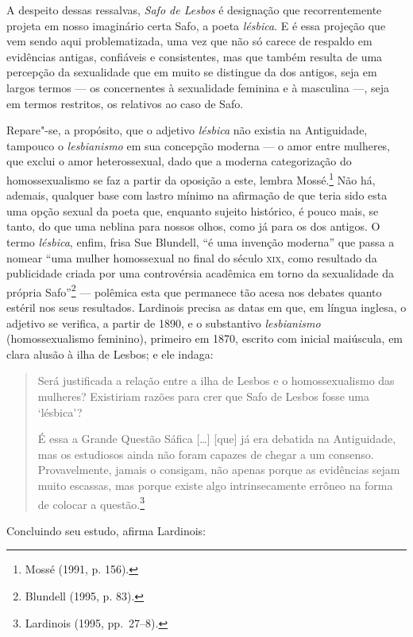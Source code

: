 A despeito dessas ressalvas, \textit{Safo de Lesbos} é designação que
recorrentemente projeta em nosso imaginário certa Safo, a poeta
\textit{lésbica}. E é essa projeção que vem sendo aqui
problematizada, uma vez que não só carece de respaldo em evidências antigas,
confiáveis e consistentes, mas que também resulta de uma percepção da
sexualidade que em muito se distingue da dos antigos, seja em largos termos ---
os concernentes à sexualidade feminina e à masculina ---, seja em termos
restritos, os relativos ao caso de Safo. 

Repare"-se, a propósito, que o adjetivo \textit{lésbica} não existia na
Antiguidade, tampouco o \textit{lesbianismo} em sua concepção moderna --- o amor
entre mulheres, que exclui o amor heterossexual, dado que a moderna
categorização do homossexualismo se faz a partir da oposição a este, lembra Mossé.\footnote{ Mossé (1991, p. 156).} Não há,
ademais, qualquer base com lastro mínimo na afirmação de que teria sido esta
uma opção sexual da poeta que, enquanto sujeito histórico, é pouco mais, se
tanto, do que uma neblina para nossos olhos, como já para os dos antigos. O
termo \textit{lésbica}, enfim, frisa Sue Blundell, “é uma
invenção moderna” que passa a nomear “uma mulher homossexual no final do século
\textsc{xix}, como resultado da publicidade criada por uma controvérsia acadêmica em
torno da sexualidade da própria Safo”\footnote{ Blundell (1995, p. 83).} --- polêmica esta que permanece tão acesa
nos debates quanto estéril nos seus resultados.
Lardinois precisa as datas em que, em
língua inglesa, o adjetivo se verifica, a partir de 1890, e o substantivo
\textit{lesbianismo} (homossexualismo feminino), primeiro em 1870, escrito com
inicial maiúscula, em clara alusão à ilha de Lesbos; e ele indaga:

\begin{quote}
Será justificada a relação entre a ilha de Lesbos e o homossexualismo das
mulheres? Existiriam razões para crer que Safo de Lesbos fosse uma ‘lésbica’?

É essa a Grande Questão Sáfica [\ldots{}] [que] já era debatida na Antiguidade, mas
os estudiosos ainda não foram capazes de chegar a um consenso. Provavelmente,
jamais o consigam, não apenas porque as evidências sejam muito escassas, mas
porque existe algo intrinsecamente errôneo na forma de colocar a questão.\footnote{ Lardinois (1995, pp.~27--8).}
\end{quote}

Concluindo seu estudo, afirma Lardinois:

